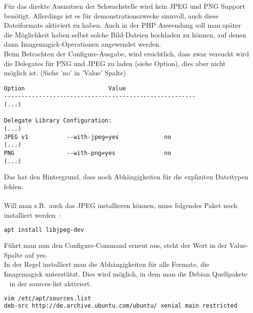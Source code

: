 Für das direkte Ausnutzen der Schwachstelle wird kein JPEG und PNG Support benötigt.
Allerdings ist es für demonstrationszwecke sinnvoll, auch diese Dateiformate aktiviert zu haben.
Auch in der PHP Anwendung soll man später die Möglichkeit haben selbst solche Bild-Dateien hochladen zu können,
auf denen dann Imagemagick-Operationen angewendet werden.\\

Beim Betrachten der Configure-Ausgabe, wird ersichtlich,
dass zwar versucht wird die Delegates für PNG und JPEG zu laden (siehe Option),
dies aber nicht möglich ist. (Siehe 'no' in 'Value' Spalte)

\begin{lstlisting}[language=Text, caption=Imagemagick Installation: Auszug aus Configure-Output,label={lst:installconfigureoutput}]
              Option                        Value
-------------------------------------------------------
(...)

Delegate Library Configuration:
(...)
JPEG v1           --with-jpeg=yes             no
(...)
PNG               --with-png=yes              no
(...)
\end{lstlisting}
\vspace{5mm}

Das hat den Hintergrund, dass noch Abhängigkeiten für die expliziten Dateitypen fehlen.\\\\

Will man z.B.\ auch das JPEG installieren können, muss folgendes Paket noch installiert werden~\cite{ImageMagickPNGDelegate}:

\begin{lstlisting}[language=Bash, caption=Imagemagick Installation: Delegate Dependencies,label={lst:installdelegatedep}]
apt install libjpeg-dev
\end{lstlisting}
\vspace{5mm}

\newpage

Führt man nun den Configure-Command erneut aus, steht der Wert in der Value-Spalte auf yes.\\

In der Regel installiert man die Abhängigkeiten für alle Formate, die Imagemagick unterstützt.
Dies wird möglich, in dem man die Debian Quellpakete
~\cite{DateiEtcApt} in der sources-list aktiviert.~\cite{HowInstallImageMagick}\\


\begin{lstlisting}[language=Bash, caption=Imagemagick Installation: Sources List,label={lst:installsourcelist}]
vim /etc/apt/sources.list
deb-src http://de.archive.ubuntu.com/ubuntu/ xenial main restricted
\end{lstlisting}
\vspace{5mm}

